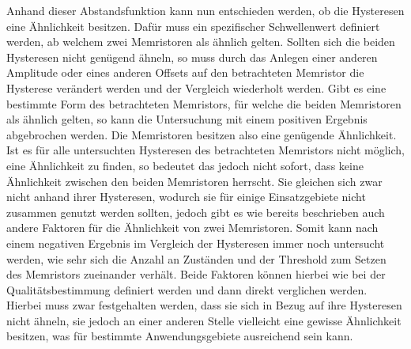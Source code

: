 Anhand dieser Abstandsfunktion kann nun entschieden werden, ob die Hysteresen eine Ähnlichkeit besitzen. Dafür muss ein spezifischer Schwellenwert definiert werden, ab welchem zwei Memristoren als ähnlich gelten. Sollten sich die beiden Hysteresen nicht genügend ähneln, so muss durch das Anlegen einer anderen Amplitude oder eines anderen Offsets auf den betrachteten Memristor die Hysterese verändert werden und der Vergleich wiederholt werden. Gibt es eine bestimmte Form des betrachteten Memristors, für welche die beiden Memristoren als ähnlich gelten, so kann die Untersuchung mit einem positiven Ergebnis abgebrochen werden. Die Memristoren besitzen also eine genügende Ähnlichkeit. Ist es für alle untersuchten Hysteresen des betrachteten Memristors nicht möglich, eine Ähnlichkeit zu finden, so bedeutet das jedoch nicht sofort, dass keine Ähnlichkeit zwischen den beiden Memristoren herrscht. Sie gleichen sich zwar nicht anhand ihrer Hysteresen, wodurch sie für einige Einsatzgebiete nicht zusammen genutzt werden sollten, jedoch gibt es wie bereits beschrieben auch andere Faktoren für die Ähnlichkeit von zwei Memristoren. Somit kann nach einem negativen Ergebnis im Vergleich der Hysteresen immer noch untersucht werden, wie sehr sich die Anzahl an Zuständen und der Threshold zum Setzen des Memristors zueinander verhält. Beide Faktoren können hierbei wie bei der Qualitätsbestimmung definiert werden und dann direkt verglichen werden. Hierbei muss zwar festgehalten werden, dass sie sich in Bezug auf ihre Hysteresen nicht ähneln, sie jedoch an einer anderen Stelle vielleicht eine gewisse Ähnlichkeit besitzen, was für bestimmte Anwendungsgebiete ausreichend sein kann.

